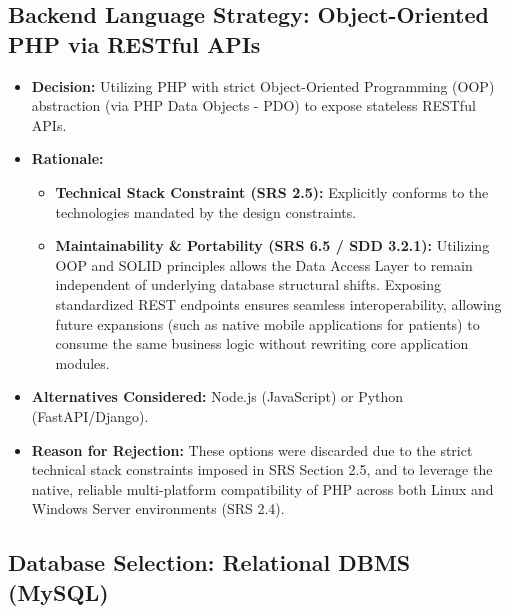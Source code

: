 \subsection{Backend Language Strategy: Object-Oriented PHP via RESTful APIs}
\label{subsec:rationale_backend}

\begin{itemize}
	\item \textbf{Decision:} Utilizing PHP with strict Object-Oriented Programming (OOP) abstraction (via PHP Data Objects - PDO) to expose stateless RESTful APIs.
	\item \textbf{Rationale:} 
	\begin{itemize}
		\item \textbf{Technical Stack Constraint (SRS 2.5):} Explicitly conforms to the technologies mandated by the design constraints.
		\item \textbf{Maintainability \& Portability (SRS 6.5 / SDD 3.2.1):} Utilizing OOP and SOLID principles allows the Data Access Layer to remain independent of underlying database structural shifts. Exposing standardized REST endpoints ensures seamless interoperability, allowing future expansions (such as native mobile applications for patients) to consume the same business logic without rewriting core application modules.
	\end{itemize}
	\item \textbf{Alternatives Considered:} Node.js (JavaScript) or Python (FastAPI/Django).
	\item \textbf{Reason for Rejection:} These options were discarded due to the strict technical stack constraints imposed in SRS Section 2.5, and to leverage the native, reliable multi-platform compatibility of PHP across both Linux and Windows Server environments (SRS 2.4).
\end{itemize}

\subsection{Database Selection: Relational DBMS (MySQL)}
\label{subsec:rationale_database}

